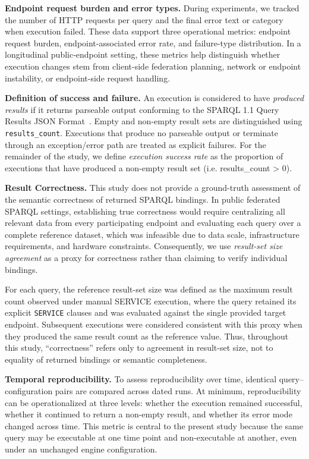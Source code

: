 \documentclass[runningheads]{llncs}
\begin{document}
\textbf{Endpoint request burden and error types.}
During experiments, we tracked the number of HTTP requests per query and the final error text or category when execution failed. 
These data support three operational metrics: endpoint request burden, endpoint-associated error rate, and failure-type distribution. 
In a longitudinal public-endpoint setting, these metrics help distinguish whether execution changes stem from client-side federation planning, network or endpoint instability, or endpoint-side request handling.

\textbf{Definition of success and failure.}
An execution is considered to have \emph{produced results} if it returns parseable output conforming to the SPARQL 1.1 Query Results JSON Format~\cite{sparql11resultsjson}. 
Empty and non-empty result sets are distinguished using \texttt{results\_count}. 
Executions that produce no parseable output or terminate through an exception/error path are treated as explicit failures.
For the remainder of the study, we define \emph{execution success rate} as the proportion of executions that have produced a non-empty result set (i.e. results\_count > 0). 

\textbf{Result Correctness.}
This study does not provide a ground-truth assessment of the semantic correctness of returned SPARQL bindings.
In public federated SPARQL settings, establishing true correctness would require centralizing all relevant data from every participating endpoint and evaluating each query over a complete reference dataset, which was infeasible due to data scale, infrastructure requirements, and hardware constraints.
Consequently, we use \textit{result-set size agreement} as a proxy for correctness rather than claiming to verify individual bindings.

For each query, the reference result-set size was defined as the maximum result count observed under manual \textsc{SERVICE} execution, where the query retained its explicit \texttt{SERVICE} clauses and was evaluated against the single provided target endpoint.
Subsequent executions were considered consistent with this proxy when they produced the same result count as the reference value.
Thus, throughout this study, ``correctness'' refers only to agreement in result-set size, not to equality of returned bindings or semantic completeness.

\textbf{Temporal reproducibility.}
To assess reproducibility over time, identical query--configuration pairs are compared across dated runs. 
At minimum, reproducibility can be operationalized at three levels: whether the execution remained successful, whether it continued to return a non-empty result, and whether its error mode changed across time. 
This metric is central to the present study because the same query may be executable at one time point and non-executable at another, even under an unchanged engine configuration.
\end{document}
